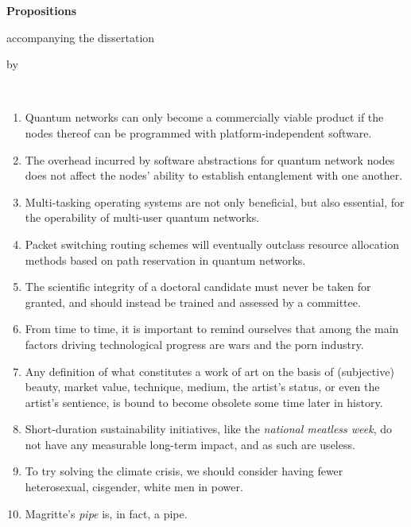 \begin{center}

{\Large\titlefont\bfseries Propositions}

\medskip

accompanying the dissertation

\medskip

{\makeatletter
\titlestyle\bfseries\large\@title
\makeatother}

{\makeatletter
\ifx\@subtitle\undefined\else
\titlefont\titleshape\@subtitle
\fi
\makeatother}

\medskip

by

\medskip

\makeatletter
{\large\titlefont\bfseries\@firstname\ {\titleshape\@lastname}}
\makeatother

\end{center}

\bigskip

\begin{enumerate}[widest=10]
    \item Quantum networks can only become a commercially viable product if the nodes thereof can be
          programmed with platform-independent software.
    \item The overhead incurred by software abstractions for quantum network nodes does not affect
          the nodes' ability to establish entanglement with one another.
    \item Multi-tasking operating systems are not only beneficial, but also essential, for the
          operability of multi-user quantum networks.
    \item Packet switching routing schemes will eventually outclass resource allocation methods
          based on path reservation in quantum networks.
    \item The scientific integrity of a doctoral candidate must never be taken for granted, and
          should instead be trained and assessed by a committee.
    \item From time to time, it is important to remind ourselves that among the main factors driving
          technological progress are wars and the porn industry.
    \item Any definition of what constitutes a work of art on the basis of (subjective) beauty,
          market value, technique, medium, the artist's status, or even the artist's sentience, is
          bound to become obsolete some time later in history.
    \item Short-duration sustainability initiatives, like the \emph{national meatless week}, do not
          have any measurable long-term impact, and as such are useless.
    \item To try solving the climate crisis, we should consider having fewer heterosexual,
          cisgender, white men in power.
    \item Magritte's \emph{pipe} is, in fact, a pipe.
\end{enumerate}

